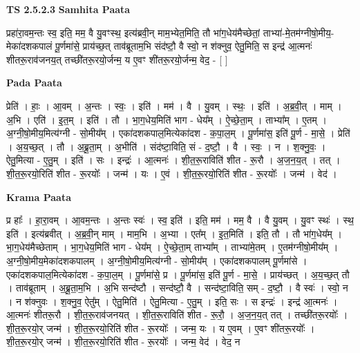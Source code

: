 \documentclass[17pt]{extarticle}
\begin{document}
\textbf{TS 2.5.2.3 } \newline
\textbf{Samhita Paata} \newline

प्रहा॑रा॒वम॒न्तः स्व॒ इति॒ मम॒ वै यु॒वꣳस्थ॒ इत्य॑ब्रवी॒न् माम॒भ्येत॒मिति॒ तौ भा॑ग॒धेय॑मैच्छेतां॒ ताभ्या॑-मे॒तम॑ग्नीषो॒मीय॒-मेका॑दशकपालं पू॒र्णमा॑से॒ प्राय॑च्छ॒त् ताव॑ब्रूताम॒भि संद॑ष्टौ॒ वै स्वो॒ न श॑क्नुव॒ ऐतु॒मिति॒ स इन्द्र॑ आ॒त्मनः॑ शीतरू॒राव॑जनय॒त् तच्छी॑तरू॒रयो॒र्जन्म॒ य ए॒वꣳ शी॑तरू॒रयो॒र्जन्म॒ वेद॒ - [  ] \newline

\textbf{Pada Paata} \newline

प्रेति॑ । हाः॒ । आ॒वम् । अ॒न्तः । स्वः॒ । इति॑ । मम॑ । वै । यु॒वम् । स्थः॒ । इति॑ । अ॒ब्र॒वी॒त् । माम् । अ॒भि । एति॑ । इ॒त॒म् । इति॑ । तौ । भा॒ग॒धेय॒मिति॑ भाग - धेय᳚म् । ऐ॒च्छे॒ता॒म् । ताभ्या᳚म् । ए॒तम् । अ॒ग्नी॒षो॒मीय॒मित्य॑ग्नी - सो॒मीय᳚म् । एका॑दशकपाल॒मित्येका॑दश - क॒पा॒ल॒म् । पू॒र्णमा॑स॒ इति॑ पू॒र्ण - मा॒से॒ । प्रेति॑ । अ॒य॒च्छ॒त् । तौ । अ॒ब्रू॒ता॒म् । अ॒भीति॑ । संद॑ष्टा॒विति॒ सं - द॒ष्टौ॒ । वै । स्वः॒ । न । श॒क्नु॒वः॒ । ऐतु॒मित्या - ए॒तु॒म् । इति॑ । सः । इन्द्रः॑ । आ॒त्मनः॑ । शी॒त॒रू॒राविति॑ शीत - रू॒रौ । अ॒ज॒न॒य॒त् । तत् । शी॒त॒रू॒रयो॒रिति॑ शीत - रू॒रयोः᳚ । जन्म॑ । यः । ए॒वं । शी॒त॒रू॒रयो॒रिति॑ शीत - रू॒रयोः᳚ । जन्म॑ । वेद॑ ।  \newline


\textbf{Krama Paata} \newline

प्र हाः᳚ । हा॒रा॒वम् । आ॒वम॒न्तः । अ॒न्तः स्वः॑ । स्व॒ इति॑ । इति॒ मम॑ । मम॒ वै । वै यु॒वम् । यु॒वꣳ स्थः॑ । स्थ॒ इति॑ । इत्य॑ब्रवीत् । अ॒ब्र॒वी॒न् माम् । माम॒भि । अ॒भ्या । एत᳚म् । इ॒त॒मिति॑ । इति॒ तौ । तौ भा॑ग॒धेय᳚म् । भा॒ग॒धेय॑मैच्छेताम् । भा॒ग॒धेय॒मिति॑ भाग - धेय᳚म् । ऐ॒च्छे॒ता॒म् ताभ्या᳚म् । ताभ्या॑मे॒तम् । ए॒तम॑ग्नीषो॒मीय᳚म् । अ॒ग्नी॒षो॒मीय॒मेका॑दशकपालम् । अ॒ग्नी॒षो॒मीय॒मित्य॑ग्नी - सो॒मीय᳚म् । एका॑दशकपालम् पू॒र्णमा॑से । एका॑दशकपाल॒मित्येका॑दश - क॒पा॒ल॒म् । पू॒र्णमा॑से॒ प्र । पू॒र्णमा॑स॒ इति॑ पू॒र्ण - मा॒से॒ । प्राय॑च्छत् । अ॒य॒च्छ॒त् तौ । ताव॑ब्रूताम् । अ॒ब्रू॒ता॒म॒भि । अ॒भि सन्द॑ष्टौ । सन्द॑ष्टौ॒ वै । सन्द॑ष्टा॒विति॒ सम् - द॒ष्टौ॒ । वै स्वः॑ । स्वो॒ न । न श॑क्नुवः । श॒क्नु॒व॒ ऐतु᳚म् । ऐतु॒मिति॑ । ऐतु॒मित्या - ए॒तु॒म् । इति॒ सः । स इन्द्रः॑ । इन्द्र॑ आ॒त्मनः॑ । आ॒त्मनः॑ शीतरू॒रौ । शी॒त॒रू॒राव॑जनयत् । शी॒त॒रू॒राविति॑ शीत - रू॒रौ॒ । अ॒ज॒न॒य॒त् तत् । तच्छी॑तरू॒रयोः᳚ । शी॒त॒रू॒रयो॒र् जन्म॑ । शी॒त॒रू॒रयो॒रिति॑ शीत - रू॒रयोः᳚ । जन्म॒ यः । य ए॒वम् । ए॒वꣳ शी॑तरू॒रयोः᳚ । शी॒त॒रू॒रयो॒र् जन्म॑ । शी॒त॒रू॒रयो॒रिति॑ शीत - रू॒रयोः᳚ । जन्म॒ वेद॑ । वेद॒ न \newline
\end{document}
